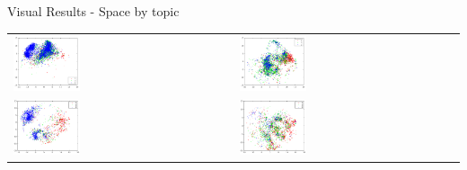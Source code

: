 \documentclass[usenames,dvipsnames]{beamer}
\begin{document}
\begin{frame}{Visual Results - Space by topic}
\vspace{-0.45cm}
\begin{table}[]
\begin{tabular}{ll}
 \includegraphics[width=0.31\textwidth]{imagenes/cluster3.png}& \includegraphics[width=0.31\textwidth]{imagenes/cluster4.png} \\
\includegraphics[width=0.31\textwidth]{imagenes/cluster8.png} & \includegraphics[width=0.31\textwidth]{imagenes/clustes7.png}
\end{tabular}
\end{table}

\end{frame}
\end{document}
